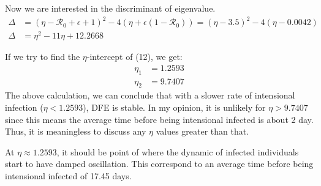 \documentclass[12pt]{article}
\begin{document}
Now we are interested in the discriminant of eigenvalue.
\begin{align}
\Delta &=(\eta-\mathcal{R}_0+\epsilon+1)^2-4(\eta+\epsilon(1-\mathcal{R}_0))=(\eta-3.5)^2-4(\eta-0.0042)\\
\Delta &=\eta^2-11\eta+12.2668
\end{align}

If we try to find the $\eta$-intercept of (12), we get:
\begin{align}
\eta_1 &= 1.2593\\
\eta_2 &= 9.7407
\end{align}
The above calculation, we can conclude that with a slower rate of intensional infection ($\eta<1.2593$), DFE is stable. In my opinion, it is unlikely for $\eta>9.7407$ since this means the average time before being intensional infected is about 2 day. Thus, it is meaningless to discuss any $\eta$ values greater than that.

At $\eta\approx 1.2593$, it should be point of where the dynamic of infected individuals start to have damped oscillation. This correspond to an average time before being intensional infected of 17.45 days.
\end{document}
